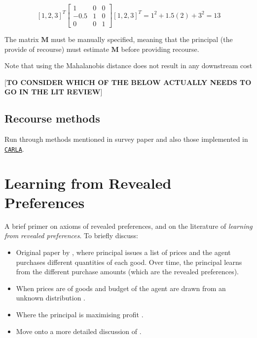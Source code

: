 \begin{equation} \label{eq:mahalanobis_example}
	[1, 2, 3]^T \left[\begin{array}{lllll}
		1 & 0 & 0 \\
		-0.5 & 1 & 0 \\
		0 & 0 & 1
	\end{array}\right] [1, 2, 3]^T = 1^2 + 1.5(2) + 3^2 = 13
\end{equation}

The matrix $\mathbf{M}$ must be manually specified, meaning that the principal (the provide of recourse) must estimate $\mathbf{M}$ before providing recourse.


Note that using the Mahalanobis distance does not result in any downstream cost 

[\textbf{TO CONSIDER WHICH OF THE BELOW ACTUALLY NEEDS TO GO IN THE LIT REVIEW}]

\subsection{Recourse methods}
Run through methods mentioned in survey paper \citep{karimiSurveyAlgorithmicRecourse2022} and also those implemented in \href{https://carla-counterfactual-and-recourse-library.readthedocs.io/en/latest/recourse.html}{\texttt{CARLA}}.


\section{Learning from Revealed Preferences} \label{section:revealed_pref_lit}
A brief primer on axioms of revealed preferences, and on the literature of \textit{learning from revealed preferences}. To briefly discuss:

\begin{itemize}
	\item Original paper by \textcite{beigmanLearningRevealedPreference2006}, where principal issues a list of prices and the agent purchases different quantities of each good. Over time, the principal learns from the different purchase amounts (which are the revealed preferences).
	\item When prices are of goods and budget of the agent are drawn from an unknown distribution \citep{zadimoghaddamEfficientlyLearningRevealed2012, balcanLearningEconomicParameters2014}.
	\item Where the principal is maximising profit \citep{aminOnlineLearningProfit2015, rothWatchLearnOptimizing2016}.
	\item Move onto a more detailed discussion of \textcite{dongStrategicClassificationRevealed2018}.
\end{itemize}



